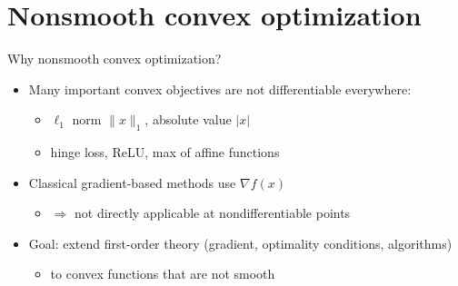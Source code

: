 \documentclass[aspectratio=169]{beamer}
\begin{document}

\section{Nonsmooth convex optimization}

\begin{frame}{Why nonsmooth convex optimization?}
\begin{itemize}
    \item Many important convex objectives are not differentiable everywhere:
    \begin{itemize}
        \item $\ell_1$ norm $\|x\|_1$, absolute value $|x|$
        \item hinge loss, ReLU, max of affine functions
    \end{itemize}
    \pause
    \item Classical gradient-based methods use $\nabla f(x)$
    \begin{itemize}
        \item $\Rightarrow$ not directly applicable at nondifferentiable points
    \end{itemize}
    \pause
    \item Goal: extend first-order theory (gradient, optimality conditions, algorithms)
    \begin{itemize}
        \item to convex functions that are not smooth
    \end{itemize}
\end{itemize}
\end{frame}

\end{document}
